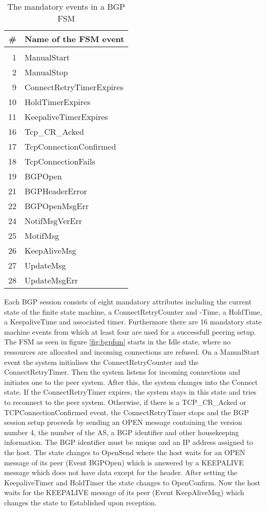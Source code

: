 \documentclass{acm_proc_article-sp}
\begin{document}
\begin{table}
\centering
    \begin{tabular}{r l}
    \# & Name of the FSM event    \\
    \hline                        \\
    1  & ManualStart              \\
    2  & ManualStop               \\
    9  & ConnectRetryTimerExpires \\
    10 & HoldTimerExpires         \\
    11 & KeepaliveTimerExpires    \\
    16 & Tcp\_CR\_Acked           \\
    17 & TcpConnectionConfirmed   \\
    18 & TcpConnectionFails       \\
    19 & BGPOpen                  \\
    21 & BGPHeaderError           \\
    22 & BGPOpenMsgErr            \\
    24 & NotifMsgVerErr           \\
    25 & MotifMsg                 \\
    26 & KeepAliveMsg             \\
    27 & UpdateMsg                \\
    28 & UpdateMsgErr             \\
    \end{tabular}
\caption{The mandatory events in a BGP FSM}
\label{tab:bgpfsmevent}
\end{table}

Each BGP session consists of eight mandatory attributes including the current state of the finite state machine, a ConnectRetryCounter and -Time, a HoldTime, a KeepaliveTime and associated timer. Furthermore there are 16 mandatory state machine events from which at least four are used for a successfull peering setup. The FSM as seen in figure \ref{fig:bgpfsm} starts in the Idle state, where no ressources are allocated and incoming connections are refused. On a ManualStart event the system initialises the ConnectRetryCounter and the ConnectRetryTimer. Then the system listens for incoming connections and initiates one to the peer system. After this, the system changes into the Connect state. If the ConnectRetryTimer expires, the system stays in this state and tries to reconnect to the peer system. Otherwise, if there is a TCP\_CR\_Acked or TCPConnectionConfirmed event, the ConnectRetryTimer stops and the BGP session setup proceeds by sending an OPEN message containing the version number 4, the number of the AS, a BGP identifier and other housekeeping information. The BGP identifier must be unique and an IP address assigned to the host. The state changes to OpenSend where the host waits for an OPEN message of its peer (Event BGPOpen) which is answered by a KEEPALIVE message which does not have data except for the header. After setting the KeepaliveTimer and HoldTimer the state changes to OpenConfirm. Now the host waits for the KEEPALIVE message of its peer (Event KeepAliveMsg) which changes the state to Established upon reception.
\end{document}

